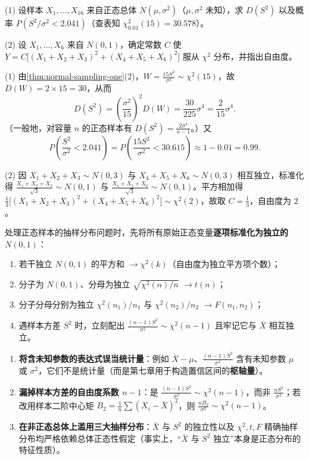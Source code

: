 \begin{example}[title={正态抽样分布的典型计算与统计量构造}]
\label{eg:sampling-calculations}
(1) 设样本 $X_1,\ldots,X_{16}$ 来自正态总体 $N(\mu,\sigma^2)$（$\mu,\sigma^2$ 未知），求 $D(S^2)$ 以及概率 $P(S^2/\sigma^2<2.041)$（查表知 $\chi_{0.01}^2(15)=30.578$）。

(2) 设 $X_1,\ldots,X_6$ 来自 $N(0,1)$，确定常数 $C$ 使 $Y=C\bigl[(X_1+X_2+X_3)^2+(X_4+X_5+X_6)^2\bigr]$ 服从 $\chi^2$ 分布，并指出自由度。
\begin{solution}
(1) 由\cref{thm:normal-sampling-one}(2)，$W=\frac{15S^2}{\sigma^2}\sim\chi^2(15)$，故 $D(W)=2\times 15=30$，从而
\[
  D(S^2)=\left(\frac{\sigma^2}{15}\right)^2 D(W)=\frac{30}{225}\sigma^4=\frac{2}{15}\sigma^4.
\]
（一般地，对容量 $n$ 的正态样本有 $D(S^2)=\frac{2\sigma^4}{n-1}$。）又
\[
  P\!\left(\frac{S^2}{\sigma^2}<2.041\right)
  =P\!\left(\frac{15S^2}{\sigma^2}<30.615\right)\approx 1-0.01=0.99.
\]

(2) 因 $X_1+X_2+X_3\sim N(0,3)$ 与 $X_4+X_5+X_6\sim N(0,3)$ 相互独立，标准化得 $\frac{X_1+X_2+X_3}{\sqrt{3}}\sim N(0,1)$ 与 $\frac{X_4+X_5+X_6}{\sqrt{3}}\sim N(0,1)$。平方相加得 $\frac{1}{3}\bigl[(X_1+X_2+X_3)^2+(X_4+X_5+X_6)^2\bigr]\sim\chi^2(2)$，故取 $C=\frac{1}{3}$，自由度为 $2$。
\end{solution}
\end{example}

\begin{method}[构造三大抽样分布统计量的标准化口诀]
处理正态样本的抽样分布问题时，先将所有原始正态变量\textbf{逐项标准化为独立的 $N(0,1)$}：
\begin{enumerate}
  \item 若干独立 $N(0,1)$ 的平方和 $\longrightarrow\chi^2(k)$（自由度为独立平方项个数）；
  \item 分子为 $N(0,1)$、分母为独立 $\sqrt{\chi^2(n)/n}$ $\longrightarrow t(n)$；
  \item 分子分母分别为独立 $\chi^2(n_1)/n_1$ 与 $\chi^2(n_2)/n_2$ $\longrightarrow F(n_1,n_2)$；
  \item 遇样本方差 $S^2$ 时，立刻配出 $\frac{(n-1)S^2}{\sigma^2}\sim\chi^2(n-1)$ 且牢记它与 $\bar{X}$ 相互独立。
\end{enumerate}
\end{method}

\begin{pitfall}[抽样分布中的三类常见误区]
\begin{enumerate}
  \item \textbf{将含未知参数的表达式误当统计量}：例如 $\bar{X}-\mu$、$\frac{(n-1)S^2}{\sigma^2}$ 含有未知参数 $\mu$ 或 $\sigma^2$，它们不是统计量（而是第七章用于构造置信区间的\textbf{枢轴量}）。
  \item \textbf{漏掉样本方差的自由度系数 $n-1$}：是 $\frac{(n-1)S^2}{\sigma^2}\sim\chi^2(n-1)$，而非 $\frac{nS^2}{\sigma^2}$；若改用样本二阶中心矩 $B_2=\frac{1}{n}\sum(X_i-\bar{X})^2$，则 $\frac{nB_2}{\sigma^2}\sim\chi^2(n-1)$。
  \item \textbf{在非正态总体上滥用三大抽样分布}：$\bar{X}$ 与 $S^2$ 的独立性以及 $\chi^2,t,F$ 精确抽样分布均严格依赖总体正态性假定（事实上，“$\bar{X}$ 与 $S^2$ 独立”本身是正态分布的特征性质）。
\end{enumerate}
\end{pitfall}

